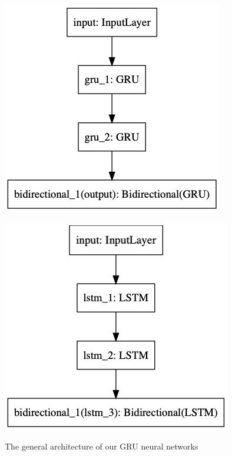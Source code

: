 \begin{figure}[h]
\centering
\begin{minipage}{.45\textwidth}
  \centering
  \includegraphics[width=1\linewidth]{./img/gru_architecture.png}
  \caption{The general architecture of our GRU neural networks}
  \label{fig:gru_architecture}
\end{minipage}%
\begin{minipage}{.45\textwidth}
  \centering
  \includegraphics[width=1\linewidth]{./img/lstm_architecture.png}
  \label{fig:lstm_architecture}
\end{minipage}
\end{figure}\label{fig:nn_architectures}


